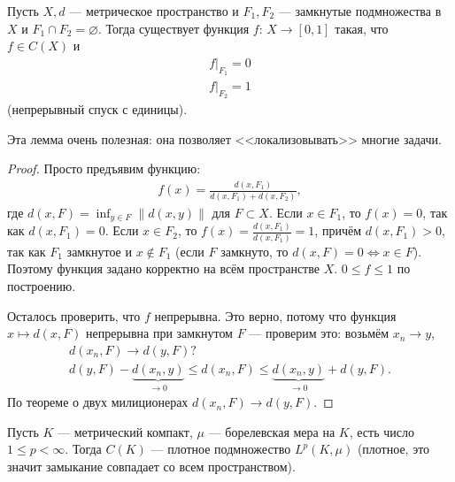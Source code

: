 \begin{lm}[Урысона]
 \label{lemma:urison_metric_space}
 Пусть $X, d$ --- метрическое пространство и  $F_1, F_2$ --- замкнутые подмножества в $X$ и $F_1 \cap F_2 = \varnothing$. Тогда существует функция $f \colon\, X \to [0,1] $ такая, что $f \in C(X)$ и \begin{align*}
  f \rvert_{F_1} = 0 \\
  f \rvert_{F_2} = 1
 \end{align*}  (непрерывный спуск с единицы).
\end{lm}

Эта лемма очень полезная: она позволяет <<локализовывать>> многие задачи.

\begin{proof}
 Просто предъявим функцию: \begin{align*}
  f(x) = \frac{d(x, F_1)}{d(x, F_1) + d(x, F_2)}
 ,\end{align*}  где $d(x, F) = \inf_{y \in F} \left\| d(x, y) \right\|$ для $F \subset X$. Если $x \in F_1$, то $f(x) = 0$, так как  $d(x, F_1) = 0$. Если  $x \in F_2$, то $f(x) = \frac{d(x, F_1)}{d(x, F_1)} = 1$, причём $d(x, F_1) > 0$, так как  $F_1$ замкнутое и $x \notin F_1$ (если $F$ замкнуто, то $d(x, F) = 0 \iff x \in F$). Поэтому функция задано корректно на всём пространстве $X$. $0 \leqslant f \leqslant 1$ по построению.

 Осталось проверить, что $f$ непрерывна. Это верно, потому что функция $x \mapsto d(x, F)$ непрерывна при замкнутом $F$ --- проверим это: возьмём $x_n \to y$, \begin{align*}
  d(x_n, F) \to d(y, F) ? \\
  d(y, F) - \underbrace{d(x_n, y)}_{\to 0} \leqslant d(x_n, F) \leqslant \underbrace{d(x_n, y)}_{\to 0} + d(y, F) 
 .\end{align*} По теореме о двух милиционерах $d(x_n, F) \to d(y, F)$.
\end{proof}
\begin{thm}[%
]
  Пусть $K$ --- метрический компакт, $\mu$ --- борелевская мера на $K$, есть число $1 \leqslant p < \infty$. Тогда $C(K)$ --- плотное подмножество $L^{p}(K, \mu)$ (плотное, это значит замыкание совпадает со всем пространством).
 
\end{thm}
